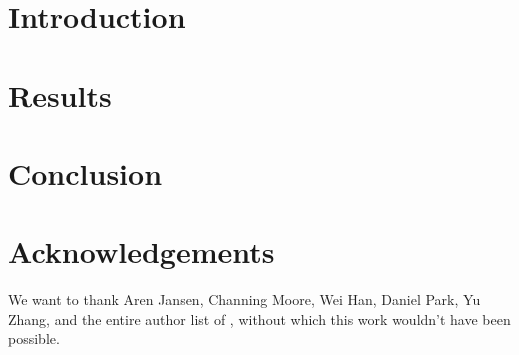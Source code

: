 \documentclass{article}
\begin{document}
\section{Introduction}
\label{sec:intro}






\section{Results}
\label{sec:results}


\vspace{-3mm}

\section{Conclusion}
\label{sec:conclusion}


\vspace{-3mm}
\section{Acknowledgements}
We want to thank Aren Jansen, Channing Moore, Wei Han, Daniel Park, Yu Zhang, and the entire author list of \cite{bigssl}, without which this work wouldn't have been possible.




%

%
\end{document}
